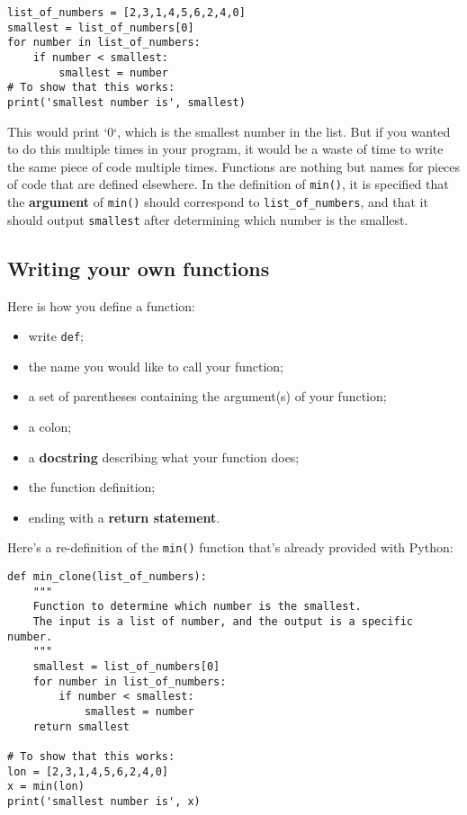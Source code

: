 \documentclass[12pt]{book}
\begin{document}
\begin{lstlisting}
list_of_numbers = [2,3,1,4,5,6,2,4,0]
smallest = list_of_numbers[0]
for number in list_of_numbers:
    if number < smallest:
        smallest = number
# To show that this works:
print('smallest number is', smallest)
\end{lstlisting}

This would print `0`, which is the smallest number in the list. But if you wanted to do this multiple times in your program, it would be a waste of time to write the same piece of code multiple times. Functions are nothing but names for pieces of code that are defined elsewhere. In the definition of \texttt{min()}, it is specified that the \textbf{argument} of \texttt{min()} should correspond to \texttt{list\_of\_numbers}, and that
it should output \texttt{smallest} after determining which number is the smallest.

\subsection{Writing your own functions}
Here is how you define a function:

\begin{itemize}
\item write \texttt{def};
\item the name you would like to call your function;
\item a set of parentheses containing the argument(s) of your function;
\item a colon;
\item a \textbf{docstring} describing what your function does;
\item the function definition;
\item ending with a \textbf{return statement}.
\end{itemize}

Here's a re-definition of the \texttt{min()} function that's already
provided with Python:

\begin{lstlisting}
def min_clone(list_of_numbers):
    """
    Function to determine which number is the smallest.
    The input is a list of number, and the output is a specific number.
    """
    smallest = list_of_numbers[0]
    for number in list_of_numbers:
        if number < smallest:
            smallest = number
    return smallest

# To show that this works:
lon = [2,3,1,4,5,6,2,4,0]
x = min(lon)
print('smallest number is', x)
\end{lstlisting}
\end{document}
